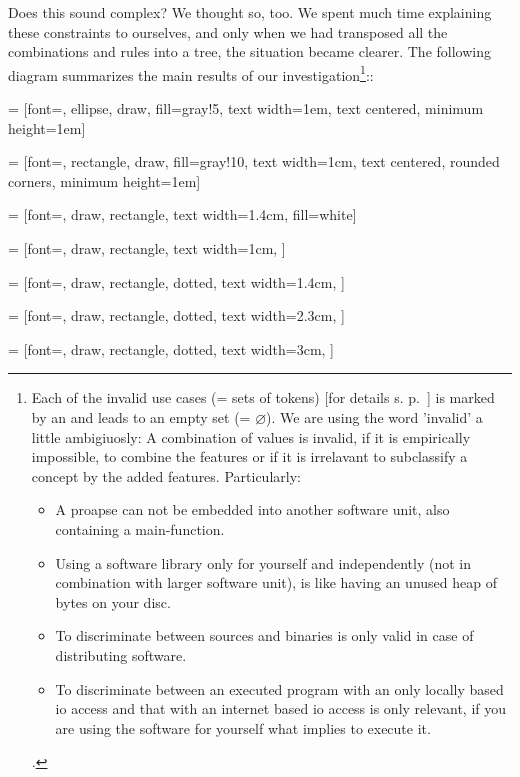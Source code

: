 Does this sound complex? We thought so, too. We spent much time explaining these
constraints to ourselves, and only when we had transposed all the combinations
and rules into a tree, the situation became clearer. The following diagram
summarizes the main results of our investigation\footnote{ Each of the invalid
use cases (= sets of tokens) [for details s. p.\
\pageref{InvalidFinderTokenCombinations}] is marked by an \lightning{} and leads
to an empty set (= $\varnothing$). We are using the word 'invalid' a little
ambigiuosly: A combination of values is invalid, if it is empirically
impossible, to combine the features or if it is irrelavant to subclassify a
concept by the added features. Particularly:
\begin{itemize}
  \item A proapse can not be embedded into another software unit, also
  containing a main-function.
  \item Using a software library only for yourself and independently (not in
  combination with larger software unit), is like having an unused heap of bytes
  on your disc.
  \item To discriminate between sources and binaries is only valid in case of
  distributing software.
  \item To discriminate between an executed program with an only locally based
  io access and that with an internet based io access is only relevant, if you
  are using the software for yourself what implies to execute it.
\end{itemize}
 . 

}::

 = [font=\tiny, ellipse, draw, fill=gray!5,
text width=1em, text centered, minimum height=1em]

 = [font=\tiny, rectangle, draw, fill=gray!10,
text width=1cm, text centered, rounded corners, minimum height=1em]

 = [font=\tiny, draw, rectangle,  text
width=1.4cm, fill=white]

 = [font=\tiny, draw, rectangle,  text
width=1cm, ]

 = [font=\tiny, draw, rectangle, dotted, text
width=1.4cm, ]

 = [font=\tiny, draw, rectangle, dotted, text
width=2.3cm, ]

 = [font=\tiny, draw, rectangle, dotted, text
width=3cm, ]

